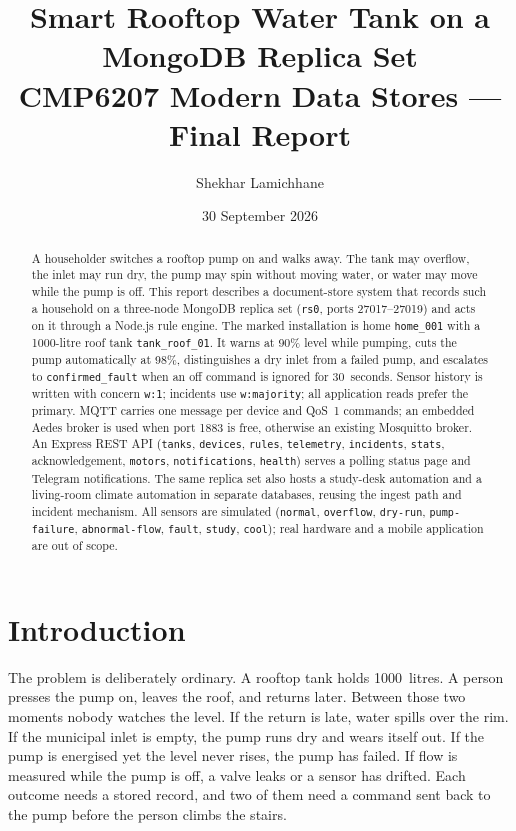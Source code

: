 \documentclass[11pt,a4paper]{article}
\title{Smart Rooftop Water Tank on a MongoDB Replica Set\\[0.35em]
\large CMP6207 Modern Data Stores --- Final Report}
\author{Shekhar Lamichhane}
\date{30 September 2026}
\begin{document}
\maketitle

\begin{abstract}
\noindent
A householder switches a rooftop pump on and walks away. The tank may overflow, the inlet may run dry, the pump may spin without moving water, or water may move while the pump is off. This report describes a document-store system that records such a household on a three-node MongoDB replica set (\texttt{rs0}, ports 27017--27019) and acts on it through a Node.js rule engine. The marked installation is home \texttt{home\_001} with a 1000-litre roof tank \texttt{tank\_roof\_01}. It warns at 90\% level while pumping, cuts the pump automatically at 98\%, distinguishes a dry inlet from a failed pump, and escalates to \texttt{confirmed\_fault} when an off command is ignored for 30~seconds. Sensor history is written with concern \texttt{w:1}; incidents use \texttt{w:majority}; all application reads prefer the primary. MQTT carries one message per device and QoS~1 commands; an embedded Aedes broker is used when port 1883 is free, otherwise an existing Mosquitto broker. An Express REST API (\texttt{tanks}, \texttt{devices}, \texttt{rules}, \texttt{telemetry}, \texttt{incidents}, \texttt{stats}, acknowledgement, \texttt{motors}, \texttt{notifications}, \texttt{health}) serves a polling status page and Telegram notifications. The same replica set also hosts a study-desk automation and a living-room climate automation in separate databases, reusing the ingest path and incident mechanism. All sensors are simulated (\texttt{normal}, \texttt{overflow}, \texttt{dry-run}, \texttt{pump-failure}, \texttt{abnormal-flow}, \texttt{fault}, \texttt{study}, \texttt{cool}); real hardware and a mobile application are out of scope.
\end{abstract}

\tableofcontents
\newpage

\section{Introduction}

The problem is deliberately ordinary. A rooftop tank holds 1000~litres. A person presses the pump on, leaves the roof, and returns later. Between those two moments nobody watches the level. If the return is late, water spills over the rim. If the municipal inlet is empty, the pump runs dry and wears itself out. If the pump is energised yet the level never rises, the pump has failed. If flow is measured while the pump is off, a valve leaks or a sensor has drifted. Each outcome needs a stored record, and two of them need a command sent back to the pump before the person climbs the stairs.
\end{document}
